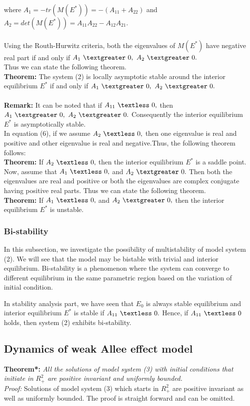 \documentclass[a4paper, 10pt]{article}
\begin{document}
	where $A_1=-tr(M(E^*))=-(A_{11}+A_{22})$ and $A_2=det(M(E^*))=A_{11}A_{22}-A_{12}A_{21}.$\\\\
	Using the Routh-Hurwitz criteria, both the eigenvalues of $M(E^*)$ have negative real part if and only if $A_1~\textgreater~0,~A_2~\textgreater~0.$\\
	\medskip Thus we can state the following theorem.\\ 
	\textbf{Theorem:} The system (2) is locally asymptotic stable around the interior equilibrium $E^*$ if and only if $A_1~\textgreater~0,~A_2~\textgreater~0.$\\\\
	\textbf{Remark:} It can be noted that if $A_{11}~\textless~0,$ then $A_1~\textgreater~0,~A_2~\textgreater~0.$ Consequently the interior equilibrium $E^*$ is \smallskip asymptotically stable.\\
	In equation (6), if we assume $A_2~\textless~0,$ then one eigenvalue is real and positive and other eigenvalue is real and negative.\medskip Thus, the following theorem follows:\\
	\medskip \textbf{Theorem:} If $A_2~\textless~0,$ then the interior equilibrium $E^*$ is a saddle point. \\
	Now, assume that $A_1~\textless~0,$ and $A_2~\textgreater~0.$ Then both the eigenvalues are real and positive or both the eigenvalues are \smallskip complex conjugate having positive real parts. Thus we can state the following theorem.\\
	\medskip \textbf{Theorem:} If $A_1~\textless~0,$ and $A_2~\textgreater~0,$ then the interior equilibrium $E^*$ is unstable.
	\subsubsection{Bi-stability}
	In this subsection, we investigate the possibility of multistability of model system (2).
	We will see that the model may be bistable with trivial and interior equilibrium. Bi-stability is a phenomenon where the system can converge to different equilibrium in the same parametric region based on the variation of initial condition.\par 
	In stability analysis part, we have seen that $E_0$ is always stable equilibrium and interior equilibrium $E^*$ is stable if $A_{11}~\textless ~0.$ Hence, if $A_{11}~\textless ~0$ holds, then system (2) exhibits bi-stability.

	\subsection{Dynamics of weak Allee effect model}
	\textbf{Theorem*:}\textit{ All the solutions of model system (3) with initial conditions that initiate in $R_+^2$ are positive invariant and uniformly bounded.\\
		Proof:} Solutions of model system (3) which starts in $R_+^2$ are positive invariant as well as uniformly bounded. The proof is straight forward and can be omitted.\\\\
\end{document}
